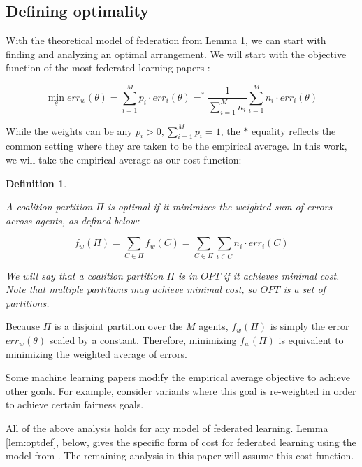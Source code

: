 \documentclass{article}
\newcommand{\cd}[0]{\cdot}
\newtheorem{definition}{Definition}
\newcommand{\nplayer}[0]{\ensuremath{M}}
\newcommand{\mean}[0]{\ensuremath{\theta}}
\newcommand{\ndraw}[0]{\ensuremath{n}}
\newcommand{\col}[0]{\ensuremath{C}}
\newcommand{\costw}[0]{\ensuremath{f_w}}
\newcommand{\partition}[0]{\ensuremath{\Pi}}
\begin{document}
\subsection{Defining optimality}\label{sec:opt}

With the theoretical model of federation from Lemma 1, we can start with finding and analyzing an optimal arrangement. We will start with the objective function of the most federated learning papers \cite{mcmahan2016communicationefficient}:

\begin{equation*}
    \min_\mean err_w(\mean) = \sum_{i=1}^{\nplayer}p_i \cd err_i(\mean) =^* \frac{1}{\sum_{i=1}^{\nplayer}\ndraw_i}\sum_{i=1}^{\nplayer}\ndraw_i\cd err_i(\mean)
\end{equation*}

While the weights can be any $p_i > 0, \sum_{i=1}^{\nplayer}p_i=1$, the $*$ equality reflects the common setting where they are taken to be the empirical average. In this work, we will take the empirical average as our cost function: 

\begin{definition}\label{def:opt}

A coalition partition $\partition$ is optimal if it minimizes the weighted sum of errors across agents, as defined below: 

$$\costw(\Pi) = \sum_{\col \in \partition}\costw(\col) = \sum_{\col \in \partition}\sum_{i \in \col}\ndraw_i \cd err_{i}(\col)$$

We will say that a coalition partition $\partition$ is in $OPT$ if it achieves minimal cost. Note that multiple partitions may achieve minimal cost, so $OPT$ is a set of partitions. 

\end{definition}

Because $\partition$ is a disjoint partition over the $\nplayer$ agents, $\costw(\partition)$ is simply the error $err_w(\mean)$ scaled by a constant. Therefore, minimizing $\costw(\partition)$ is equivalent to minimizing the weighted average of errors.
 
Some machine learning papers modify the empirical average objective to achieve other goals. For example, \cite{li2019fair, mohri2019agnostic} consider variants where this goal is re-weighted in order to achieve certain fairness goals.

All of the above analysis holds for any model of federated learning. Lemma \ref{lem:optdef}, below, gives the specific form of cost for federated learning using the model from \cite{donahue2020model}. The remaining analysis in this paper will assume this cost function.
\end{document}
